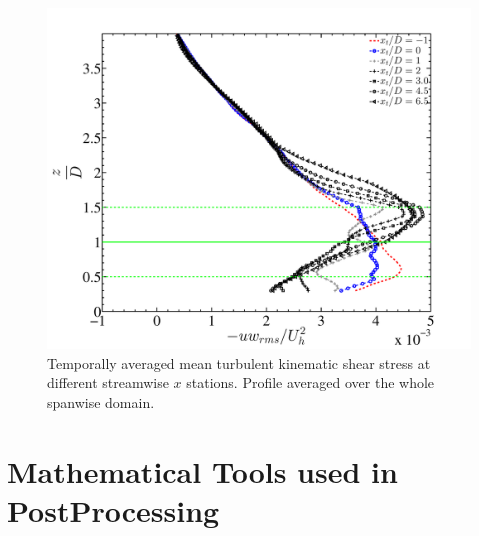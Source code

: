 \begin{figure}
\centering
\includegraphics[width = 0.8\linewidth]{stats/shrprof_Npoints_avg.pdf}
\caption[Mean shear stress at $x$ stations 3]{Temporally averaged mean turbulent kinematic shear stress at different streamwise $x$ stations. Profile averaged over the whole spanwise domain.}\label{fig:shrstat3}
\end{figure}





\section{Mathematical Tools used in PostProcessing}
